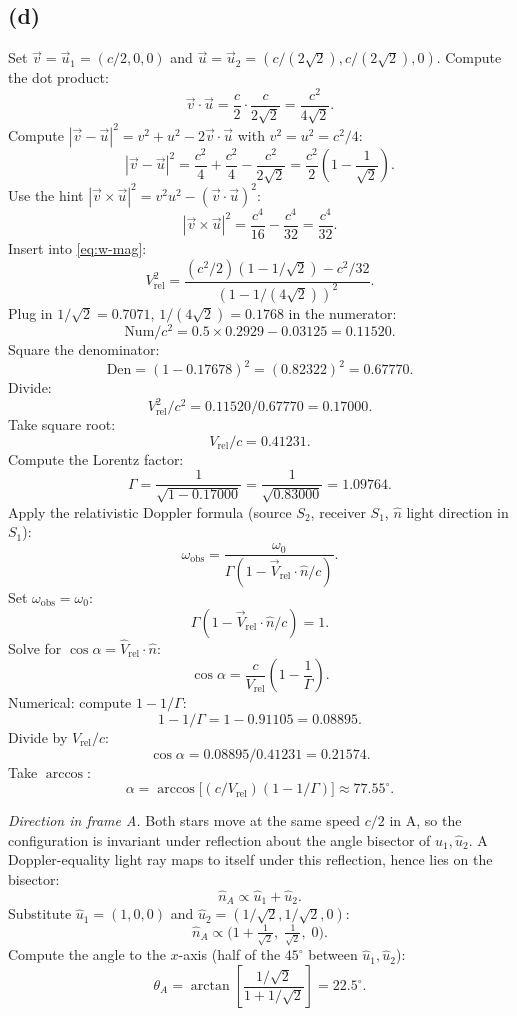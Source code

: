 \documentclass[11pt]{article}
\begin{document}
\subsection*{(d)}
Set $\vec v=\vec u_{1}=(c/2,0,0)$ and $\vec u=\vec u_{2}=(c/(2\sqrt 2),c/(2\sqrt 2),0)$. Compute the dot product:
\[ \vec v\cdot\vec u=\frac{c}{2}\cdot\frac{c}{2\sqrt 2}=\frac{c^{2}}{4\sqrt{2}}. \]
Compute $|\vec v-\vec u|^{2}=v^{2}+u^{2}-2\vec v\cdot\vec u$ with $v^{2}=u^{2}=c^{2}/4$:
\[ |\vec v-\vec u|^{2}=\frac{c^{2}}{4}+\frac{c^{2}}{4}-\frac{c^{2}}{2\sqrt 2}=\frac{c^{2}}{2}\!\left(1-\frac{1}{\sqrt 2}\right). \]
Use the hint $|\vec v\times\vec u|^{2}=v^{2}u^{2}-(\vec v\cdot\vec u)^{2}$:
\[ |\vec v\times\vec u|^{2}=\frac{c^{4}}{16}-\frac{c^{4}}{32}=\frac{c^{4}}{32}. \]
Insert into \eqref{eq:w-mag}:
\[ V_{\mathrm{rel}}^{2}=\frac{(c^{2}/2)(1-1/\sqrt{2})-c^{2}/32}{(1-1/(4\sqrt{2}))^{2}}. \]
Plug in $1/\sqrt{2}=0.7071$, $1/(4\sqrt{2})=0.1768$ in the numerator:
\[ \text{Num}/c^{2}=0.5\times 0.2929-0.03125=0.11520. \]
Square the denominator:
\[ \text{Den}=(1-0.17678)^{2}=(0.82322)^{2}=0.67770. \]
Divide:
\[ V_{\mathrm{rel}}^{2}/c^{2}=0.11520/0.67770=0.17000. \]
Take square root:
\[ V_{\mathrm{rel}}/c=0.41231. \]
Compute the Lorentz factor:
\[ \Gamma=\frac{1}{\sqrt{1-0.17000}}=\frac{1}{\sqrt{0.83000}}=1.09764. \]
Apply the relativistic Doppler formula (source $S_{2}$, receiver $S_{1}$, $\hat n$ light direction in $S_{1}$):
\[ \omega_{\mathrm{obs}}=\frac{\omega_{0}}{\Gamma(1-\vec V_{\mathrm{rel}}\cdot\hat n/c)}. \]
Set $\omega_{\mathrm{obs}}=\omega_{0}$:
\[ \Gamma(1-\vec V_{\mathrm{rel}}\cdot\hat n/c)=1. \]
Solve for $\cos\alpha=\hat V_{\mathrm{rel}}\cdot\hat n$:
\[ \cos\alpha=\frac{c}{V_{\mathrm{rel}}}\!\left(1-\frac{1}{\Gamma}\right). \]
Numerical: compute $1-1/\Gamma$:
\[ 1-1/\Gamma=1-0.91105=0.08895. \]
Divide by $V_{\mathrm{rel}}/c$:
\[ \cos\alpha=0.08895/0.41231=0.21574. \]
Take $\arccos$:
\[ \boxed{\;\alpha=\arccos\!\big[(c/V_{\mathrm{rel}})(1-1/\Gamma)\big]\approx 77.55^{\circ}.\;} \]

\textit{Direction in frame A.} Both stars move at the same speed $c/2$ in A, so the configuration is invariant under reflection about the angle bisector of $\hat u_{1},\hat u_{2}$. A Doppler-equality light ray maps to itself under this reflection, hence lies on the bisector:
\[ \hat n_{A}\propto\hat u_{1}+\hat u_{2}. \]
Substitute $\hat u_{1}=(1,0,0)$ and $\hat u_{2}=(1/\sqrt 2,1/\sqrt 2,0)$:
\[ \boxed{\;\hat n_{A}\propto\Big(1+\tfrac{1}{\sqrt 2},\;\tfrac{1}{\sqrt 2},\;0\Big).\;} \]
Compute the angle to the $x$-axis (half of the $45^{\circ}$ between $\hat u_{1},\hat u_{2}$):
\[ \theta_{A}=\arctan\!\left[\frac{1/\sqrt 2}{1+1/\sqrt 2}\right]=22.5^{\circ}. \]
\end{document}
